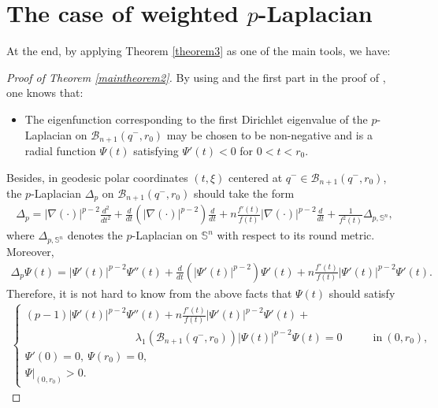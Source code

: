 \documentclass[12pt]{article}
\begin{document}
\section{The case of weighted $p$-Laplacian}  \label{sect5}
\renewcommand{\thesection}{\arabic{section}}
\renewcommand{\theequation}{\thesection.\arabic{equation}}
\setcounter{equation}{0}


At the end, by applying Theorem \ref{theorem3} as one of the main
tools, we have:

\begin{proof} [Proof of Theorem \ref{maintheorem2}]
By using \cite[Proposition 3.1]{JM4} and the first part in the proof
of \cite[Theorem 3.2]{JM4}, one knows that:
\begin{itemize}
\item The eigenfunction corresponding to the first Dirichlet eigenvalue
of the $p$-Laplacian on $\mathscr{B}_{n+1}(q^{-},r_0)$ may be chosen
to be non-negative and is a radial function $\Psi(t)$ satisfying
$\Psi'(t)<0$ for $0<t<r_0$.
\end{itemize}
Besides, in geodesic polar coordinates $(t,\xi)$ centered at
$q^{-}\in \mathscr{B}_{n+1}(q^{-},r_0)$, the $p$-Laplacian
$\Delta_{p}$ on $\mathscr{B}_{n+1}(q^{-},r_0)$ should take the form
 \begin{eqnarray*}
\Delta_{p}=|\nabla
(\cdot)|^{p-2}\frac{d^{2}}{dt^{2}}+\frac{d}{dt}(|\nabla
(\cdot)|^{p-2})\frac{d}{dt}+n\frac{f'(t)}{f(t)}|\nabla
(\cdot)|^{p-2}\frac{d}{dt}+\frac{1}{f^{2}(t)}\Delta
_{p,\mathbb{S}^{n}},
 \end{eqnarray*}
where $\Delta_{p,\mathbb{S}^{n}}$ denotes the $p$-Laplacian on
$\mathbb{S}^n$ with respect to its round metric. Moreover,
 \begin{eqnarray*}
\Delta_{p}\Psi(t)=|\Psi'(t)|^{p-2}\Psi''(t)+\frac{d}{dt}(|\Psi'(t)|^{p-2})\Psi'(t)+n\frac{f'(t)}{f(t)}|\Psi'(t)|^{p-2}\Psi'(t).
\end{eqnarray*}
Therefore, it is not hard to know from the above facts that
$\Psi(t)$ should satisfy
\begin{eqnarray} \label{firsteigenfunction-2}
\left\{
\begin{array}{llll}
(p-1)|\Psi'(t)|^{p-2}\Psi''(t)+n\frac{f'(t)}{f(t)}|\Psi'(t)|^{p-2}\Psi'(t) + \\
\qquad\qquad\qquad\qquad\qquad \lambda_{1}\left(\mathscr{B}_{n+1}(q^{-},r_0)\right)|\Psi(t)|^{p-2}\Psi(t) = 0 \qquad &\mathrm{in}~\left(0,r_0\right),  \\[1mm]
\Psi'(0)=0,~\Psi\left(r_0\right)=0, \\[0.5mm]
 \Psi|_{(0,r_0)}>0.
\end{array} \right.
\end{eqnarray}


\end{proof}
\end{document}
